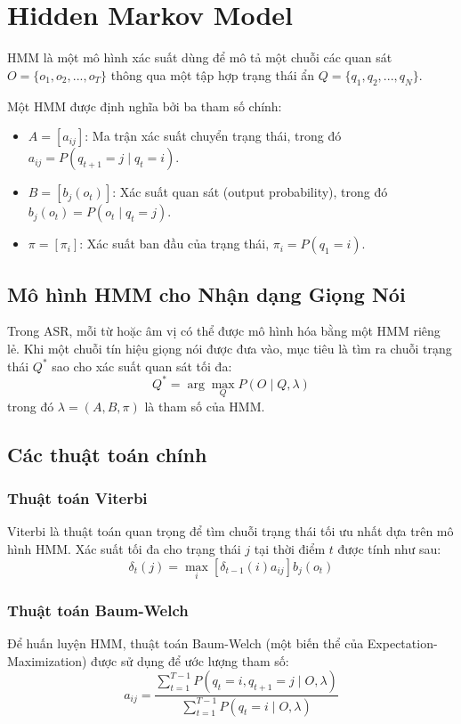\documentclass{article}
\begin{document}
\section{Hidden Markov Model}
HMM là một mô hình xác suất dùng để mô tả một chuỗi các quan sát $O = \{o_1, o_2, ..., o_T\}$ thông qua một tập hợp trạng thái ẩn $Q = \{q_1, q_2, ..., q_N\}$.

Một HMM được định nghĩa bởi ba tham số chính:
\begin{itemize}
    \item $A = [a_{ij}]$: Ma trận xác suất chuyển trạng thái, trong đó $a_{ij} = P(q_{t+1} = j \mid q_t = i)$.
    \item $B = [b_j(o_t)]$: Xác suất quan sát (output probability), trong đó $b_j(o_t) = P(o_t \mid q_t = j)$.
    \item $\pi = [\pi_i]$: Xác suất ban đầu của trạng thái, $\pi_i = P(q_1 = i)$.
\end{itemize}

\subsection{Mô hình HMM cho Nhận dạng Giọng Nói}
Trong ASR, mỗi từ hoặc âm vị có thể được mô hình hóa bằng một HMM riêng lẻ. Khi một chuỗi tín hiệu giọng nói được đưa vào, mục tiêu là tìm ra chuỗi trạng thái $Q^*$ sao cho xác suất quan sát tối đa:
\begin{equation}
    Q^* = \arg\max_Q P(O \mid Q, \lambda)
\end{equation}
trong đó $\lambda = (A, B, \pi)$ là tham số của HMM.

\subsection{Các thuật toán chính}
\subsubsection{Thuật toán Viterbi}
Viterbi là thuật toán quan trọng để tìm chuỗi trạng thái tối ưu nhất dựa trên mô hình HMM. Xác suất tối đa cho trạng thái $j$ tại thời điểm $t$ được tính như sau:
\begin{equation}
    \delta_t(j) = \max_i \left[ \delta_{t-1}(i) a_{ij} \right] b_j(o_t)
\end{equation}
\subsubsection{Thuật toán Baum-Welch}
Để huấn luyện HMM, thuật toán Baum-Welch (một biến thể của Expectation-Maximization) được sử dụng để ước lượng tham số:
\begin{equation}
    a_{ij} = \frac{\sum_{t=1}^{T-1} P(q_t = i, q_{t+1} = j \mid O, \lambda)}{\sum_{t=1}^{T-1} P(q_t = i \mid O, \lambda)}
\end{equation}
\end{document}

